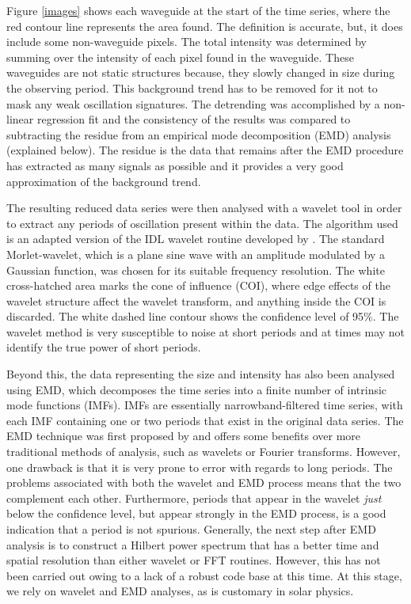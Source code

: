 	Figure \ref{images} shows each waveguide at the start of the time series, where the red contour line represents the area found.
	The definition is accurate, but, it does include some non-waveguide pixels.
	The total intensity was determined by summing over the intensity of each pixel found in the waveguide.
	These waveguides are not static structures because, they slowly changed in size during the observing period.
	This background trend has to be removed for it not to mask any weak oscillation signatures.
	The detrending was accomplished by a non-linear regression fit and the consistency of the results was compared to subtracting the residue from an empirical mode decomposition (EMD) analysis (explained below).
	The residue is the data that remains after the EMD procedure has extracted as many signals as possible and it provides a very good approximation of the background trend.
 
	The resulting reduced data series were then analysed with a wavelet tool in order to extract any periods of oscillation present within the data.
	The algorithm used is an adapted version of the IDL wavelet routine developed by \citet{torrence}.
	The standard Morlet-wavelet, which is a plane sine wave with an amplitude modulated by a Gaussian function, was chosen for its suitable frequency resolution.
	The white cross-hatched area marks the cone of influence (COI), where edge effects of the wavelet structure affect the wavelet transform, and anything inside the COI is discarded.
	The white dashed line contour shows the confidence level of 95\%.
	The wavelet method is very susceptible to noise at short periods and at times may not identify the true power of short periods.
	
	Beyond this, the data representing the size and intensity has also been analysed using EMD, which decomposes the time series into a finite number of intrinsic mode functions (IMFs).
	IMFs are essentially narrowband-filtered time series, with each IMF containing one or two periods that exist in the original data series.
	The EMD technique was first proposed by \citet{huang} and offers some benefits over more traditional methods of analysis, such as wavelets or Fourier transforms.
	However, one drawback is that it is very prone to error with regards to long periods.
	The problems associated with both the wavelet and EMD process means that the two complement each other.
	Furthermore, periods that appear in the wavelet \textit{just} below the confidence level, but appear strongly in the EMD process, is a good indication that a period is not spurious.
	Generally, the next step after EMD analysis is to construct a Hilbert power spectrum that has a better time and spatial resolution than either wavelet or FFT routines.
	However, this has not been carried out owing to a lack of a robust code base at this time.
	At this stage, we rely on wavelet and EMD analyses, as is customary in solar physics.

